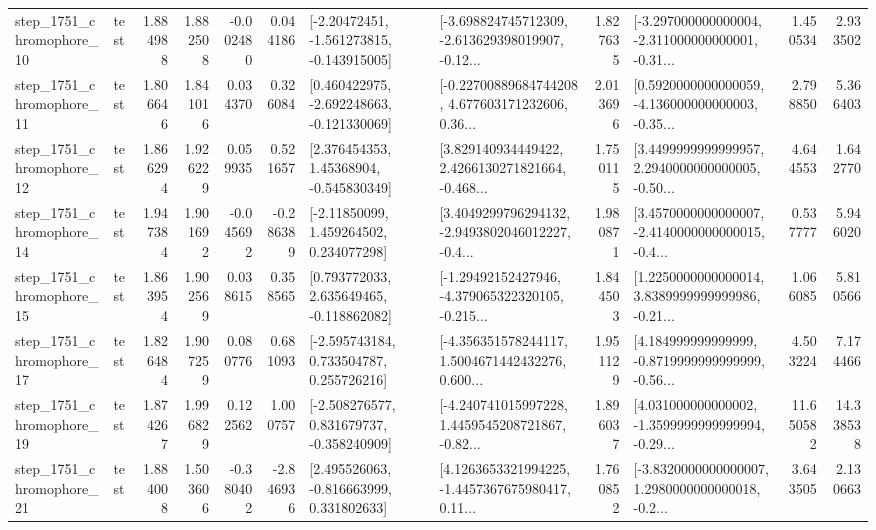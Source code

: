 \begin{tabular}{llrrrrllrlrr}
 step\_1751\_chromophore\_10 &      test &      1.884988 &    1.882508 &     -0.002480 &  0.044186 &   [-2.20472451, -1.561273815, -0.143915005] &  [-3.698824745712309, -2.613629398019907, -0.12... &       1.827635 &  [-3.297000000000004, -2.311000000000001, -0.31... &            1.450534 &          2.933502 \\
 step\_1751\_chromophore\_11 &      test &      1.806646 &    1.841016 &      0.034370 &  0.326084 &   [0.460422975, -2.692248663, -0.121330069] &  [-0.22700889684744208, 4.677603171232606, 0.36... &       2.013696 &  [0.5920000000000059, -4.136000000000003, -0.35... &            2.798850 &          5.366403 \\
 step\_1751\_chromophore\_12 &      test &      1.866294 &    1.926229 &      0.059935 &  0.521657 &     [2.376454353, 1.45368904, -0.545830349] &  [3.829140934449422, 2.4266130271821664, -0.468... &       1.750115 &  [3.4499999999999957, 2.2940000000000005, -0.50... &            4.644553 &          1.642770 \\
 step\_1751\_chromophore\_14 &      test &      1.947384 &    1.901692 &     -0.045692 & -0.286389 &     [-2.11850099, 1.459264502, 0.234077298] &  [3.4049299796294132, -2.9493802046012227, -0.4... &       1.980871 &  [3.4570000000000007, -2.4140000000000015, -0.4... &            0.537777 &          5.946020 \\
 step\_1751\_chromophore\_15 &      test &      1.863954 &    1.902569 &      0.038615 &  0.358565 &    [0.793772033, 2.635649465, -0.118862082] &  [-1.29492152427946, -4.379065322320105, -0.215... &       1.844503 &  [1.2250000000000014, 3.8389999999999986, -0.21... &            1.066085 &          5.810566 \\
 step\_1751\_chromophore\_17 &      test &      1.826484 &    1.907259 &      0.080776 &  0.681093 &    [-2.595743184, 0.733504787, 0.255726216] &  [-4.356351578244117, 1.5004671442432276, 0.600... &       1.951129 &  [4.184999999999999, -0.8719999999999999, -0.56... &            4.503224 &          7.174466 \\
 step\_1751\_chromophore\_19 &      test &      1.874267 &    1.996829 &      0.122562 &  1.000757 &   [-2.508276577, 0.831679737, -0.358240909] &  [-4.240741015997228, 1.4459545208721867, -0.82... &       1.896037 &  [4.031000000000002, -1.3599999999999994, -0.29... &           11.650582 &         14.338538 \\
 step\_1751\_chromophore\_21 &      test &      1.884008 &    1.503606 &     -0.380402 & -2.846936 &    [2.495526063, -0.816663999, 0.331802633] &  [4.1263653321994225, -1.4457367675980417, 0.11... &       1.760852 &  [-3.8320000000000007, 1.2980000000000018, -0.2... &            3.643505 &          2.130663 \\

\end{tabular}
